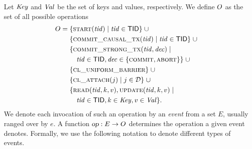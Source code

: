 Let $\mathit{Key}$ and $\mathit{Val}$ be the set of keys and values, respectively.
We define $O$ as the set of all possible operations
\begin{align*}
  O = \;&\{\textsc{start}(\mathit{tid}) \mid \mathit{tid} \in {\sf TID}\} \;\cup \\
    &\{\textsc{commit\_causal\_tx}(\mathit{tid}) \mid \mathit{tid} \in {\sf TID}\} \;\cup \\
    &\{\textsc{commit\_strong\_tx}(\mathit{tid}, \mathit{dec}) \mid \\
      &\quad \mathit{tid} \in {\sf TID}, \mathit{dec} \in \{\textsc{commit}, \textsc{abort}\}\} \;\cup \\
    &\{\textsc{cl\_uniform\_barrier}\} \;\cup \\
    &\{\textsc{cl\_attach}(j) \mid j \in \mathcal{D}\} \;\cup \\
    &\{\textsc{read}(\mathit{tid}, k, v), \textsc{update}(\mathit{tid}, k, v) \mid \\
      &\quad \mathit{tid} \in {\sf TID}, k \in \mathit{Key}, v \in \mathit{Val}\}.
\end{align*}
We denote each invocation of such an operation by an \emph{event}
from a set $E$, usually ranged over by $e$.
A function $\textsl{op} : E \to O$ determines the operation a given event denotes.
Formally, we use the following notation to denote different types of events.
